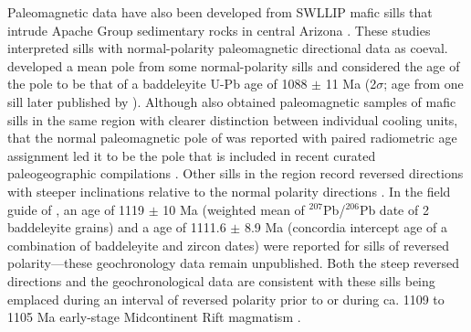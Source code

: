 Paleomagnetic data have also been developed from SWLLIP mafic sills that intrude Apache Group sedimentary rocks in central Arizona \citep{Helsley1972a, Donadini2011a}. These studies interpreted sills with normal-polarity paleomagnetic directional data as coeval. \cite{Donadini2011a} developed a mean pole from some normal-polarity sills and considered the age of the pole to be that of a baddeleyite U-Pb age of 1088 $\pm$ 11 Ma (2$\sigma$; age from one sill later published by \cite{Bright2014a}). Although \cite{Harlan1993a} also obtained paleomagnetic samples of mafic sills in the same region with clearer distinction between individual cooling units, that the normal paleomagnetic pole of \cite{Donadini2011a} was reported with paired radiometric age assignment led it to be the pole that is included in recent curated paleogeographic compilations \cite[e.g.][]{Evans2021a}. Other sills in the region record reversed directions with steeper inclinations relative to the normal polarity directions \citep{Harlan1993a, Donadini2011a}. In the field guide of \cite{Donadini2012a}, an age of 1119 $\pm$ 10 Ma (weighted mean of $^{207}$Pb/$^{206}$Pb date of 2 baddeleyite grains) and a age of 1111.6 $\pm$ 8.9 Ma (concordia intercept age of a combination of baddeleyite and zircon dates) were reported for sills of reversed polarity---these geochronology data remain unpublished. Both the steep reversed directions and the geochronological data are consistent with these sills being emplaced during an interval of reversed polarity prior to or during ca. 1109 to 1105 Ma early-stage Midcontinent Rift magmatism \citep{Vervoort2007a, Swanson-Hysell2019a}.

